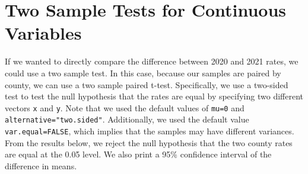 \documentclass[
  letterpaper,
]{krantz}
\makeatletter
\newenvironment{Shaded}{\begin{snugshade}}{\end{snugshade}}
\newcommand{\AttributeTok}[1]{\textcolor[rgb]{0.40,0.45,0.13}{#1}}
\newcommand{\CommentTok}[1]{\textcolor[rgb]{0.37,0.37,0.37}{#1}}
\newcommand{\FunctionTok}[1]{\textcolor[rgb]{0.28,0.35,0.67}{#1}}
\newcommand{\NormalTok}[1]{\textcolor[rgb]{0.00,0.23,0.31}{#1}}
\newcommand{\OtherTok}[1]{\textcolor[rgb]{0.00,0.23,0.31}{#1}}
\newcommand{\SpecialCharTok}[1]{\textcolor[rgb]{0.37,0.37,0.37}{#1}}
\newcommand{\StringTok}[1]{\textcolor[rgb]{0.13,0.47,0.30}{#1}}
\newenvironment{kframe}{%
\medskip{}
\setlength{\fboxsep}{.8em}
 \def\at@end@of@kframe{}%
 \ifinner\ifhmode%
  \def\at@end@of@kframe{\end{minipage}}%
  \begin{minipage}{\columnwidth}%
 \fi\fi%
 \def\FrameCommand##1{\hskip\@totalleftmargin \hskip-\fboxsep
 \colorbox{shadecolor}{##1}\hskip-\fboxsep
     \hskip-\linewidth \hskip-\@totalleftmargin \hskip\columnwidth}%
 \MakeFramed {\advance\hsize-\width
   \@totalleftmargin\z@ \linewidth\hsize
   \@setminipage}}%
 {\par\unskip\endMakeFramed%
 \at@end@of@kframe}
\renewenvironment{Shaded}{\begin{kframe}}{\end{kframe}}
\makeatother
\begin{document}
\begin{Shaded}
\end{Shaded}

\begin{Shaded}
\end{Shaded}

\section{Two Sample Tests for Continuous
Variables}\label{two-sample-tests-for-continuous-variables}

If we wanted to directly compare the difference between 2020 and 2021
rates, we could use a two sample test. In this case, because our samples
are paired by county, we can use a two sample paired t-test.
Specifically, we use a two-sided test to test the null hypothesis that
the rates are equal by specifying two different vectors \texttt{x} and
\texttt{y}. Note that we used the default values of \texttt{mu=0} and
\texttt{alternative="two.sided"}. Additionally, we used the default
value \texttt{var.equal=FALSE}, which implies that the samples may have
different variances. From the results below, we reject the null
hypothesis that the two county rates are equal at the 0.05 level. We
also print a 95\% confidence interval of the difference in means.
\end{document}
